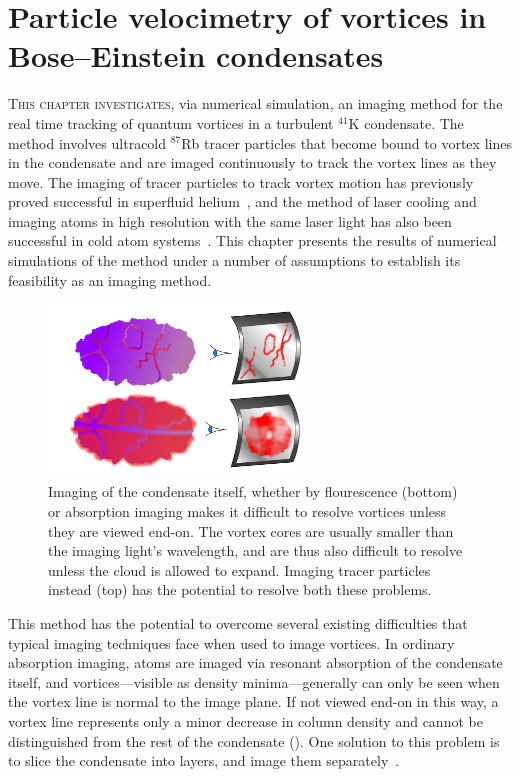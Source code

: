 
\chapter{Particle velocimetry of vortices in Bose–Einstein condensates}\label{chap:velocimetry}

\lettrine[lines=3]{T}{his chapter investigates}, via numerical simulation, an imaging method for the real time tracking of quantum vortices in a turbulent $^{41}$K condensate. The method involves ultracold $^{87}$Rb tracer particles that become bound to vortex lines in the condensate and are imaged continuously to track the vortex lines as they move. The imaging of tracer particles to track vortex motion has previously proved successful in superfluid helium~\cite{bewley_generation_2009, bewley_superfluid_2006, packard_vortex_1982}, and the method of laser cooling and imaging atoms in high resolution with the same laser light has also been successful in cold atom systems~\cite{bakr_quantum_2009}. This chapter presents the results of numerical simulations of the method under a number of assumptions to establish its feasibility as an imaging method. 

\begin{figure}
\begin{center}
\includegraphics[width=0.6\textwidth]{figures/unsorted/side-on.pdf}
\caption{\label{fig:side-on}Imaging of the condensate itself, whether by flourescence (bottom) or absorption imaging makes it difficult to resolve vortices unless they are viewed end-on. The vortex cores are usually smaller than the imaging light's wavelength, and are thus also difficult to resolve unless the cloud is allowed to expand. Imaging tracer particles instead (top) has the potential to resolve both these problems.}\label{fig:side_on}
\end{center}
\end{figure}

This method has the potential to overcome several existing difficulties that typical imaging techniques face when used to image vortices. In ordinary absorption imaging, atoms are imaged via resonant absorption of the condensate itself, and vortices---visible as density minima---generally can only be seen when the vortex line is normal to the image plane. If not viewed end-on in this way, a vortex line represents only a minor decrease in column density and cannot be distinguished from the rest of the condensate (). One solution to this problem is to slice the condensate into layers, and image them separately~\cite{anderson_watching_2001}.

